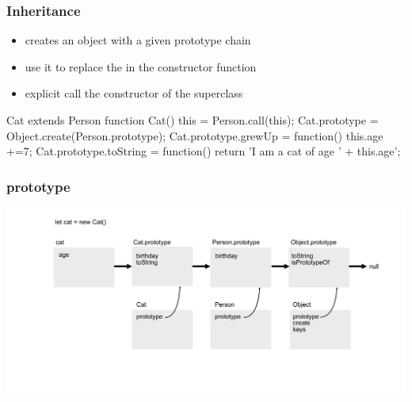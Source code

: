 \begin{frame}[fragile] \frametitle{Inheritance}
\begin{itemize}
  \item {} creates an object with a given prototype chain
  \item use it to replace the  in the constructor function
  \item explicit call the constructor of the superclass
\end{itemize}
\vspace{2mm}
\begin{CodeBox}{Cat extends Person}
function Cat() {
  this = Person.call(this);
}
Cat.prototype = Object.create(Person.prototype);
Cat.prototype.grewUp = function() { this.age +=7; }
Cat.prototype.toString = function() {
  return 'I am a cat of age ' + this.age';
}
\end{CodeBox}
\end{frame}

\begin{frame}[fragile] \frametitle{prototype}
  \centering
  \includegraphics[width=14cm]{img/prototype_chain5}
\end{frame}


